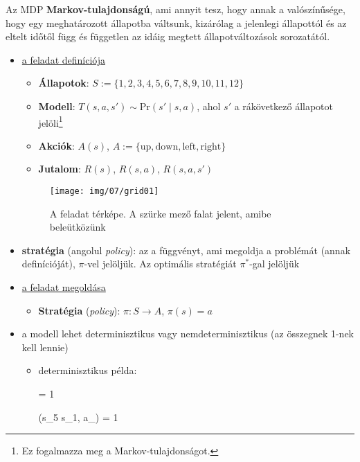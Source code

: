 \documentclass[a4paper, 11pt]{article}
\begin{document}
\begin{tcolorbox}
	Az MDP \textbf{Markov-tulajdonságú}, ami annyit tesz, hogy annak a valószínűsége, hogy egy meghatározott állapotba váltsunk, kizárólag a jelenlegi állapottól és az eltelt időtől függ és független az idáig megtett állapotváltozások sorozatától.
\end{tcolorbox}

\begin{itemize}
	\item \underline{a feladat definíciója}
	\begin{itemize}
		\item \textbf{Állapotok}: $S := \{ 1, 2, 3, 4, 5, 6, 7, 8, 9, 10, 11, 12 \}$
		\item \textbf{Modell}: $T(s, a, s') \sim \text{Pr}(s' \mid s, a)$, ahol $s'$ a rákövetkező állapotot jelöli\footnote{Ez fogalmazza meg a Markov-tulajdonságot.}
		\item \textbf{Akciók}: $A(s)$, $A := \{ \text{up}, \text{down}, \text{left}, \text{right} \}$
		\item \textbf{Jutalom}: $R(s)$, $R(s, a)$, $R(s, a, s')$
	\end{itemize}
	\begin{figure}[h!]
		\centering
		\texttt{[image: img/07/grid01]}
		\caption{A feladat térképe. A szürke mező falat jelent, amibe beleütközünk}
	\end{figure}
	\item \textbf{stratégia} (angolul \textit{policy}): az a függvényt, ami megoldja a problémát (annak definícióját), $\pi$-vel jelöljük. Az optimális stratégiát $\pi^*$-gal jelöljük
	\item \underline{a feladat megoldása}
	\begin{itemize}
		\item \textbf{Stratégia} (\textit{{policy}}): $\pi : S \to A$, $\pi(s) = a$
	\end{itemize}
	\item a modell lehet determinisztikus vagy nemdeterminisztikus (az összegnek 1-nek kell lennie)
	\begin{itemize}
		\item determinisztikus példa:
		\begin{flalign*}
			\sum {} = 1 \Longleftarrow
			\begin{cases}
				(s_5 \mid s_1, a_) = 1 \\

\end{cases}
\end{flalign*}
\end{itemize}
\end{itemize}
\end{document}
